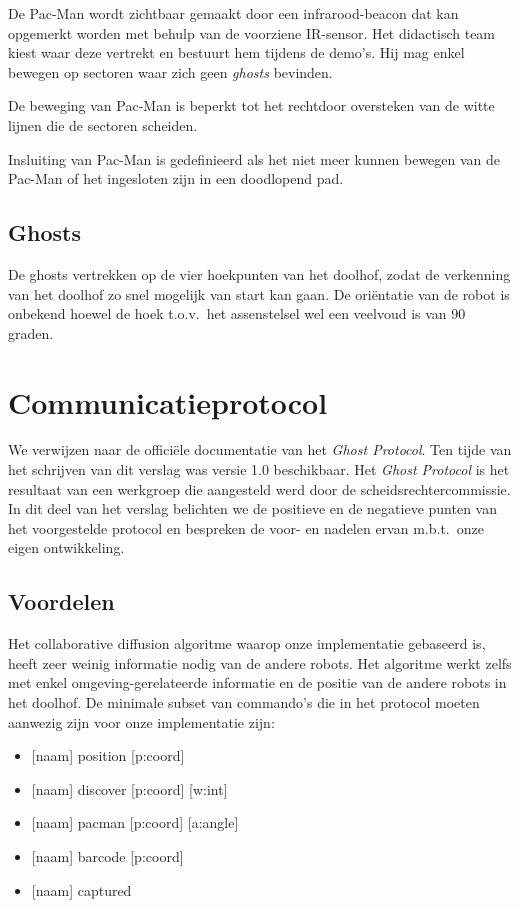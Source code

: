 \documentclass[12pt,a4paper]{report}
\begin{document}
De Pac-Man wordt zichtbaar gemaakt door een infrarood-beacon dat kan opgemerkt worden met behulp van de voorziene IR-sensor. Het didactisch team kiest waar deze vertrekt en bestuurt hem tijdens de demo's. Hij mag enkel bewegen op sectoren waar zich geen \emph{ghosts} bevinden.

De beweging van Pac-Man is beperkt tot het rechtdoor oversteken van de witte lijnen die de sectoren scheiden.

Insluiting van Pac-Man is gedefinieerd als het niet meer kunnen bewegen van de Pac-Man of het ingesloten zijn in een doodlopend pad.

\subsection{Ghosts}

De ghosts vertrekken op de vier hoekpunten van het doolhof, zodat de verkenning van het doolhof zo snel mogelijk van start kan gaan. De ori\"entatie van de robot is onbekend hoewel de hoek t.o.v.\ het assenstelsel wel een veelvoud is van 90 graden.


\section{Communicatieprotocol}

We verwijzen naar de offici\"ele documentatie van het \emph{Ghost Protocol}. Ten tijde van het schrijven van dit verslag was versie 1.0 beschikbaar. Het \emph{Ghost Protocol} is het resultaat van een werkgroep die aangesteld werd door de scheidsrechtercommissie. In dit deel van het verslag belichten we de positieve en de negatieve punten van het voorgestelde protocol en bespreken de voor- en nadelen ervan m.b.t.\ onze eigen ontwikkeling.

\subsection{Voordelen}

Het collaborative diffusion algoritme waarop onze implementatie gebaseerd is, heeft zeer weinig informatie nodig van de andere robots. Het algoritme werkt zelfs met enkel omgeving-gerelateerde informatie en de positie van de andere robots in het doolhof. De minimale subset van commando's die in het protocol moeten aanwezig zijn voor onze implementatie zijn:

\begin{itemize}
	\item{ [naam] position [p:coord]}
	\item{ [naam] discover [p:coord] [w:int]}
	\item{ [naam] pacman [p:coord] [a:angle]}
	\item{ [naam] barcode [p:coord] }
	\item{ [naam] captured }
\end{itemize}
\end{document}
